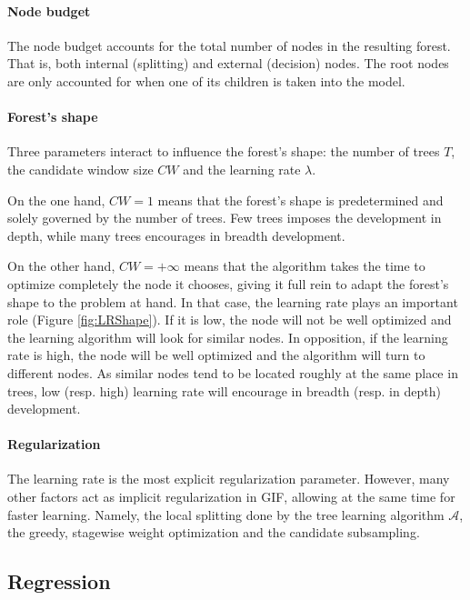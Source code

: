 \documentclass{article}
\begin{document}
\paragraph{Node budget}
The node budget accounts for the total number of nodes in the resulting forest. 
That is, both internal (splitting) and external (decision) nodes. The root 
nodes are only accounted for when one of its children is taken into the model.

\paragraph{Forest's shape}
Three parameters interact to influence the forest's shape: the number of trees 
$T$, the candidate window size $CW$ and the learning rate $\lambda$. 

On the one hand, $CW=1$ means that the forest's shape is predetermined and 
solely governed by the number of trees. Few trees imposes the development in 
depth, while many trees encourages in breadth development.

On the other hand, $CW=+\infty$ means that the algorithm takes the 
time to optimize completely the node it chooses, giving it full rein to adapt 
the forest's shape to the problem at hand. In that case, the learning rate 
plays an important role (Figure \ref{fig:LRShape}). If it is low, the node will 
not be well optimized and the learning algorithm will look for similar nodes. 
In opposition, if the learning rate is high, the node will be well optimized 
and the algorithm will turn to different nodes.
As similar nodes tend to be located roughly at the same place in trees, low 
(resp. high) learning rate will encourage in breadth (resp. in depth) 
development.


\paragraph{Regularization}
The learning rate is the most explicit regularization parameter. However, many 
other factors act as implicit regularization in GIF, allowing at the same time 
for faster learning. 
Namely, the local splitting done by the tree learning algorithm $\mathcal{A}$, 
the greedy, stagewise weight optimization and the candidate subsampling.


\subsection{Regression}
\label{subsec:regression}
\end{document}
